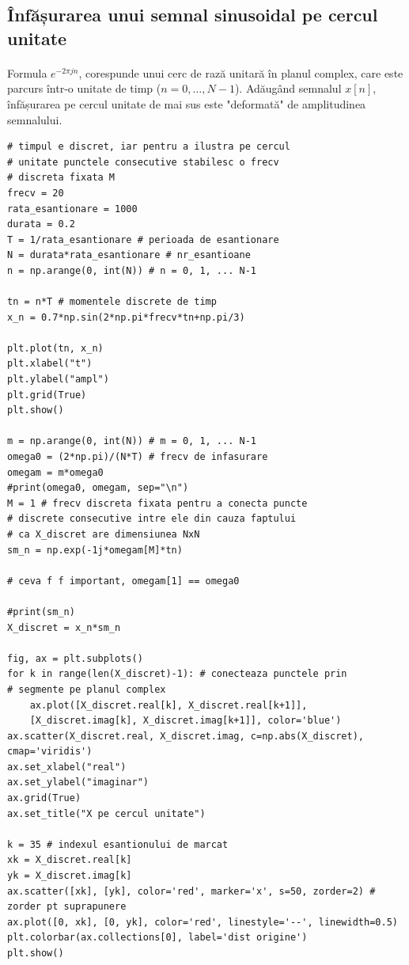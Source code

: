 \documentclass{article}
\begin{document}
\subsection*{ Înfășurarea unui semnal sinusoidal pe cercul unitate }

\paragraph{} Formula \(e^{-2\pi j n}\), corespunde unui cerc de rază unitară în planul complex, care este parcurs într-o unitate de timp (\(n = 0, \dots, N-1\)). Adăugând semnalul \(x[n]\), înfășurarea pe cercul unitate de mai sus este "deformată" de amplitudinea semnalului.

\begin{verbatim}
# timpul e discret, iar pentru a ilustra pe cercul
# unitate punctele consecutive stabilesc o frecv 
# discreta fixata M
frecv = 20
rata_esantionare = 1000
durata = 0.2
T = 1/rata_esantionare # perioada de esantionare
N = durata*rata_esantionare # nr_esantioane
n = np.arange(0, int(N)) # n = 0, 1, ... N-1

tn = n*T # momentele discrete de timp
x_n = 0.7*np.sin(2*np.pi*frecv*tn+np.pi/3)

plt.plot(tn, x_n)
plt.xlabel("t")
plt.ylabel("ampl")
plt.grid(True)
plt.show()

m = np.arange(0, int(N)) # m = 0, 1, ... N-1
omega0 = (2*np.pi)/(N*T) # frecv de infasurare
omegam = m*omega0
#print(omega0, omegam, sep="\n")
M = 1 # frecv discreta fixata pentru a conecta puncte
# discrete consecutive intre ele din cauza faptului
# ca X_discret are dimensiunea NxN
sm_n = np.exp(-1j*omegam[M]*tn)

# ceva f f important, omegam[1] == omega0

#print(sm_n)
X_discret = x_n*sm_n

fig, ax = plt.subplots()
for k in range(len(X_discret)-1): # conecteaza punctele prin
# segmente pe planul complex
    ax.plot([X_discret.real[k], X_discret.real[k+1]],
    [X_discret.imag[k], X_discret.imag[k+1]], color='blue')
ax.scatter(X_discret.real, X_discret.imag, c=np.abs(X_discret), cmap='viridis')
ax.set_xlabel("real")
ax.set_ylabel("imaginar")
ax.grid(True)
ax.set_title("X pe cercul unitate")

k = 35 # indexul esantionului de marcat
xk = X_discret.real[k]
yk = X_discret.imag[k]
ax.scatter([xk], [yk], color='red', marker='x', s=50, zorder=2) # zorder pt suprapunere
ax.plot([0, xk], [0, yk], color='red', linestyle='--', linewidth=0.5)
plt.colorbar(ax.collections[0], label='dist origine')
plt.show()
\end{verbatim}
\end{document}
